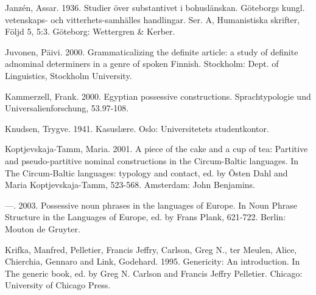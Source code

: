 \begin{styleBodytextC}
Janzén, Assar. 1936. Studier över substantivet i bohuslänskan. Göteborgs kungl. vetenskaps- och vitterhets-samhälles handlingar. Ser. A, Humanistiska skrifter, Följd 5, 5:3. Göteborg: Wettergren \& Kerber.

\end{styleBodytextC}

\begin{styleBodytextC}
Juvonen, Päivi. 2000. Grammaticalizing the definite article: a study of definite adnominal determiners in a genre of spoken Finnish. Stockholm: Dept. of Linguistics, Stockholm University.

\end{styleBodytextC}

\begin{styleBodytextC}
Kammerzell, Frank. 2000. Egyptian possessive constructions. Sprachtypologie und Universalienforschung, 53.97-108.

\end{styleBodytextC}

\begin{styleBodytextC}
Knudsen, Trygve. 1941. Kasuslære. Oslo: Universitetets studentkontor.

\end{styleBodytextC}

\begin{styleBodytextC}
Koptjevskaja-Tamm, Maria. 2001. {\textquotedbl}A piece of the cake{\textquotedbl} and {\textquotedbl}a cup of tea{\textquotedbl}: Partitive and pseudo-partitive nominal constructions in the Circum-Baltic languages. In The Circum-Baltic languages: typology and contact, ed. by Östen Dahl and Maria Koptjevskaja-Tamm, 523-568. Amsterdam: John Benjamins.

\end{styleBodytextC}

\begin{styleBodytextC}
—. 2003. Possessive noun phrases in the languages of Europe. In Noun Phrase Structure in the Languages of Europe, ed. by Frans Plank, 621-722. Berlin: Mouton de Gruyter.

\end{styleBodytextC}

\begin{styleBodytextC}
Krifka, Manfred, Pelletier, Francis Jeffry, Carlson, Greg N., ter Meulen, Alice, Chierchia, Gennaro and Link, Godehard. 1995. Genericity: An introduction. In The generic book, ed. by Greg N. Carlson and Francis Jeffry Pelletier. Chicago: University of Chicago Press.

\end{styleBodytextC}


